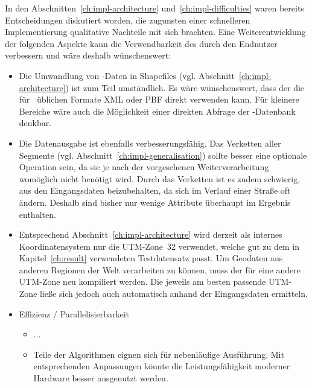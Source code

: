 \documentclass[../main/thesis.tex]{subfiles}
\begin{document}
In den Abschnitten~\ref{ch:impl-architecture} und~\ref{ch:impl-difficulties} waren bereits Entscheidungen diskutiert worden, die zugunsten einer schnelleren Implementierung qualitative Nachteile mit sich brachten.
Eine Weiterentwicklung der folgenden Aspekte kann die Verwendbarkeit des  durch den Endnutzer verbessern und wäre deshalb wünschenswert:
%
\begin{itemize}

\item
Die Umwandlung von \osm-Daten in Shapefiles (vgl. Abschnitt~\ref{ch:impl-architecture}) ist zum Teil umständlich.
Es wäre wünschenswert, dass der  die für \osm\ üblichen Formate XML oder PBF direkt verwenden kann.
Für kleinere Bereiche wäre auch die Möglichkeit einer direkten Abfrage der \osm-Datenbank denkbar.

\item
Die Datenausgabe ist ebenfalls verbesserungsfähig.
Das Verketten aller Segmente (vgl. Abschnitt~\ref{ch:impl-generalisation}) sollte besser eine optionale Operation sein, da sie je nach der vorgesehenen Weiterverarbeitung womöglich nicht benötigt wird.
Durch das Verketten ist es zudem schwierig,  aus den Eingangsdaten beizubehalten, da sich  im Verlauf einer Straße oft ändern.
Deshalb sind bisher nur wenige Attribute überhaupt im Ergebnis enthalten.

\item
Entsprechend Abschnitt~\ref{ch:impl-architecture} wird derzeit als internes Koordinatensystem nur die UTM-Zone~32 verwendet, welche gut zu dem in Kapitel~\ref{ch:result} verwendeten Testdatensatz passt.
Um Geodaten aus anderen Regionen der Welt verarbeiten zu können, muss der  für eine andere UTM-Zone neu kompiliert werden.
Die jeweils am besten passende UTM-Zone ließe sich jedoch auch automatisch anhand der Eingangsdaten ermitteln.

\item Effizienz / Parallelisierbarkeit

\begin{itemize}[nosep]
\item
...
\item
Teile der Algorithmen eignen sich für nebenläufige Ausführung.
Mit entsprechenden Anpassungen könnte die Leistungsfähigkeit moderner Hardware besser ausgenutzt werden.
\end{itemize}


\end{itemize}
\end{document}
